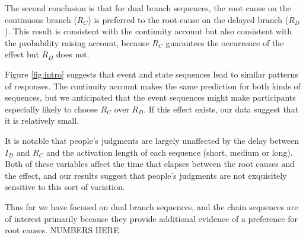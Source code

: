 \documentclass[10pt,letterpaper]{article}
\newcommand{\ev}[2]{$#1_#2$}
\begin{document}
The second conclusion is that for dual branch sequences, the root cause on the continuous branch (\ev{R}{C}) is preferred to the root cause on the delayed branch (\ev{R}{D}). This result is consistent with the continuity account but also consistent with the probability raising account, because \ev{R}{C} guarantees the occurrence of the effect but \ev{R}{D} does not. 

Figure \ref{fig:intro} suggests that event and state sequences lead to similar patterns of responses. The continuity account makes the same prediction for both kinds of sequences, but we anticipated that the event sequences might make participants especially likely to choose \ev{R}{C} over \ev{R}{D}. If this effect exists, our data suggest that it is relatively small.

It is notable that people's judgments are largely unaffected by the delay between \ev{I}{D} and \ev{R}{C} and the activation length of each sequence (short, medium or long). Both of these variables affect the time that elapses between the root causes and the effect, and our results suggest that people's judgments are not exquisitely sensitive to this sort of variation.

Thus far we have focused on dual branch sequences, and the chain sequences are of interest primarily because they provide additional evidence of a preference for root causes.  NUMBERS HERE



\end{document}
